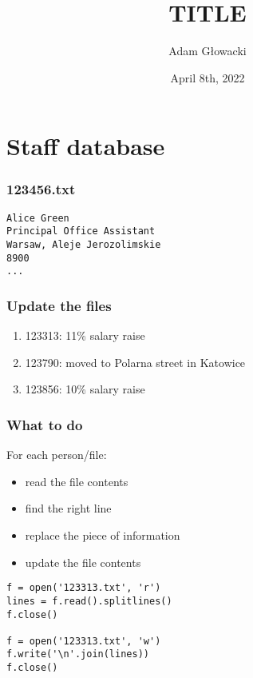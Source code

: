 \documentclass[aspectratio=169]{beamer}
\title{TITLE}
\author{Adam Głowacki}
\date{April 8th, 2022}
\begin{document}
\begin{frame}
\titlepage
\end{frame}

\section{Staff database}

\begin{frame}[fragile]
\frametitle{123456.txt}
\begin{verbatim}
Alice Green
Principal Office Assistant
Warsaw, Aleje Jerozolimskie
8900
...
\end{verbatim}
\end{frame}

\begin{frame}
\frametitle{Update the files}
\begin{enumerate}
  \item 123313: 11\% salary raise
  \item 123790: moved to Polarna street in Katowice
  \item 123856: 10\% salary raise
\end{enumerate}
\end{frame}

\begin{frame}
\frametitle{What to do}
For each person/file:
\begin{itemize}
  \item read the file contents
  \item find the right line
  \item replace the piece of information
  \item update the file contents
\end{itemize}
\end{frame}

\begin{frame}[fragile]
\begin{lstlisting}
f = open('123313.txt', 'r')
lines = f.read().splitlines()
f.close()

f = open('123313.txt', 'w')
f.write('\n'.join(lines))
f.close()
\end{lstlisting}
\end{frame}
\end{document}
